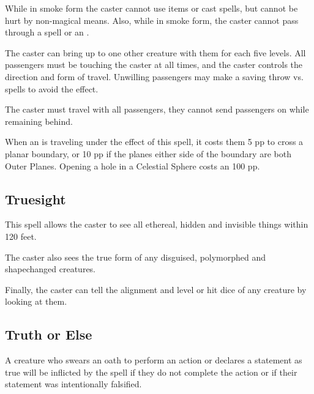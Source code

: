 \begin{multicols*}{2}
While in smoke form the caster cannot use items or cast spells, but cannot be hurt by non-magical means. Also, while in smoke form, the caster cannot pass through a  spell or an .

The caster can bring up to one other creature with them for each five levels. All passengers must be touching the caster at all times, and the caster controls the direction and form of travel. Unwilling passengers may make a saving throw vs. spells to avoid the effect.

The caster must travel with all passengers, they cannot send passengers on while remaining behind.

When an  is traveling under the effect of this spell, it costs them 5 pp to cross a planar boundary, or 10 pp if the planes either side of the boundary are both Outer Planes. Opening a hole in a Celestial Sphere costs an  100 pp.

\subsection{Truesight}\label{spell:Truesight}

This spell allows the caster to see all ethereal, hidden and invisible things within 120 feet.

The caster also sees the true form of any disguised, polymorphed and shapechanged creatures.

Finally, the caster can tell the alignment and level or hit dice of any creature by looking at them.

\subsection{Truth or Else}\label{spell:Truth or Else}

A creature who swears an oath to perform an action or declares a statement as true will be inflicted by the  spell if they do not complete the action or if their statement was intentionally falsified.


\end{multicols*}
